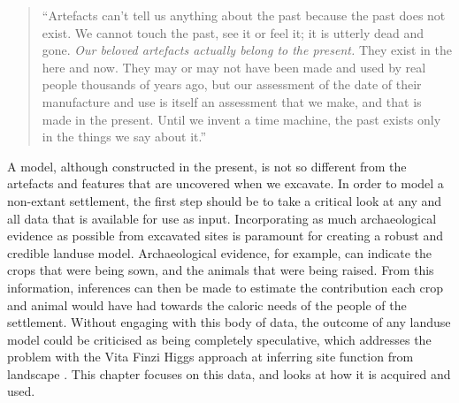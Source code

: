 \begin{quotation}
``Artefacts can't tell us anything about the past because the past does not exist. We cannot touch the past, see it or feel it; it is utterly dead and gone. \textit{Our beloved artefacts actually belong to the present.} They exist in the here and now. They may or may not have been made and used by real people thousands of years ago, but our assessment of the date of their manufacture and use is itself an assessment that we make, and that is made in the present. Until we invent a time machine, the past exists only in the things we say about it.'' \cite[12]{Johnson1999} 
\end{quotation}

A model, although constructed in the present, is not so different from the artefacts and features that are uncovered when we excavate.  In order to model a non-extant settlement, the first step should be to take a critical look at any and all data that is available for use as input. 
 Incorporating as much archaeological evidence as possible from excavated sites is paramount for creating a robust and credible landuse model.  Archaeological evidence, for example, can indicate the crops that were being sown, and the animals that were being raised.  From this information, inferences can then be made to estimate the contribution each crop and animal would have had towards the caloric needs of the people of the settlement.  
Without engaging with this body of data, the outcome of any landuse model could be criticised as being completely speculative, which addresses the problem with the Vita Finzi Higgs approach at inferring site function from landscape \citep{Jarman1972}.  This chapter focuses on this data, and looks at how it is acquired and used. %

